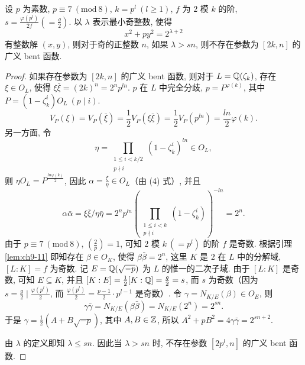 \begin{theorem}\label{thm:9.26}
设 $p$ 为素数, $p\equiv 7\ (\mathrm{mod}\ 8)$, $k=p^l\ (l\geqslant 1)$, $f$ 为 $2$ 模 $k$ 的阶, $s=\frac{\varphi(p^l)}{2f}\left(=\frac{g}{2}\right)$. 以 $\lambda$ 表示最小奇整数, 使得
\[
  x^2+py^2=2^{\lambda+2}
\]
有整数解 $(x,y)$, 则对于奇的正整数 $n$, 如果 $\lambda>sn$, 则不存在参数为 $[2k,n]$ 的广义 bent 函数.
\end{theorem}

\begin{proof}
如果存在参数为 $[2k,n]$ 的广义 bent 函数, 则对于 $L=\mathbb{Q}(\zeta_k)$, 存在 $\xi\in O_L$, 使得 $\xi\bar{\xi}=(2k)^n=2^np^{ln}$. $p$ 在 $L$ 中完全分歧, $p=P^{\varphi(k)}$, 其中 $P=(1-\zeta_k^i)O_L\ (p\mid i)$.
\begin{equation}\tag{4}
  V_P(\xi)=V_P(\bar{\xi})=\frac{1}{2}V_P(\xi\bar{\xi})
  =\frac{1}{2}V_P(p^{ln})=\frac{ln}{2}\varphi(k).
\end{equation}
另一方面, 令
\[
  \eta=\prod_{\substack{1\leqslant i<k/2\\ p\nmid i}}(1-\zeta_k^i)^{ln}\in O_L,
\]
则 $\eta O_L=P^{\frac{ln\varphi(k)}{2}}$, 因此 $\alpha=\frac{\xi}{\eta}\in O_L$（由 (4) 式）, 并且
\[
  \alpha\bar{\alpha}=\xi\bar{\xi}/\eta\bar{\eta}
  =2^np^{ln}\left(\prod_{\substack{1\leqslant i<k\\ p\nmid i}}(1-\zeta_k^i)\right)^{-ln}
  =2^n.
\]
由于 $p\equiv 7\ (\mathrm{mod}\ 8)$, $\left(\frac{2}{p}\right)=1$, 可知 $2$ 模 $k\ (=p^l)$ 的阶 $f$ 是奇数. 根据引理 \ref{lem:ch9-11} 即知存在 $\beta\in O_K$, 使得 $\beta\bar{\beta}=2^n$, 这里 $K$ 是 $2$ 在 $L$ 中的分解域, $[L:K]=f$ 为奇数. 记 $E=\mathbb{Q}(\sqrt{-p})$ 为 $L$ 的惟一的二次子域. 由于 $[L:K]$ 是奇数, 可知 $E\subseteq K$, 并且 $[K:E]=\frac{1}{2}[K:\mathbb{Q}]=\frac{g}{2}=s$, 而 $s$ 为奇数（因为 $s=\frac{g}{2}\mid\frac{\varphi(p^l)}{2}$, 而 $\frac{\varphi(p^l)}{2}=\frac{p-1}{2}\cdot p^{l-1}$ 是奇数）. 令 $\gamma=N_{K/E}(\beta)\in O_E$, 则
\[
  \gamma\bar{\gamma}=N_{K/E}(\beta\bar{\beta})=N_{K/E}(2^n)=2^{sn}.
\]
于是 $\gamma=\frac{1}{2}(A+B\sqrt{-p})$, 其中 $A,B\in\mathbb{Z}$, 所以 $A^2+pB^2=4\gamma\bar{\gamma}=2^{sn+2}$.

由 $\lambda$ 的定义即知 $\lambda\leqslant sn$. 因此当 $\lambda>sn$ 时, 不存在参数 $[2p^l,n]$ 的广义 bent 函数.
\end{proof}

